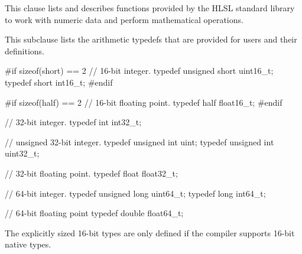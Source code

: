 
\p This clause lists and describes functions provided by the HLSL standard
library to work with numeric data and perform mathematical operations.


\p This subclause lists the arithmetic typedefs that are provided for users and
their definitions.

\begin{HLSL}
#if sizeof(short) == 2
// 16-bit integer.
typedef unsigned short uint16_t;
typedef short int16_t;
#endif

#if sizeof(half) == 2
// 16-bit floating point.
typedef half float16_t;
#endif

// 32-bit integer.
typedef int int32_t;

// unsigned 32-bit integer.
typedef unsigned int uint;
typedef unsigned int uint32_t;

// 32-bit floating point.
typedef float float32_t;

// 64-bit integer.
typedef unsigned long uint64_t;
typedef long int64_t;

// 64-bit floating point
typedef double float64_t;
\end{HLSL}

\p The explicitly sized 16-bit types are only defined if the compiler supports
16-bit native types.



